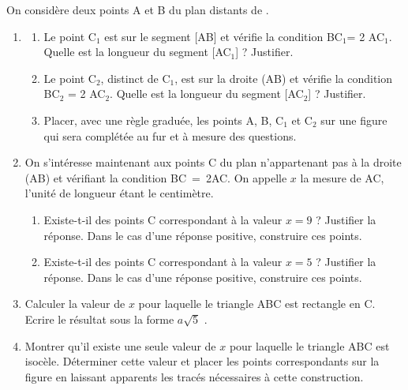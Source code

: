 \bigskip


\begin{exercice}[CRPE 2009 G1] %
   On considère deux points A et B du plan distants de .
   \begin{enumerate}
      \item 
         \begin{enumerate}
            \item Le point C$_1$ est sur le segment [AB] et vérifie la condition BC$_1$= 2 AC$_1$. Quelle est la longueur du segment [AC$_1$] ? Justifier.
            \item Le point C$_2$, distinct de C$_1$, est sur la droite (AB) et vérifie la condition BC$_2$ = 2 AC$_2$. Quelle est la longueur du segment [AC$_2$] ? Justifier.
            \item Placer, avec une règle graduée, les points A, B, C$_1$ et C$_2$ sur une figure qui sera complétée au fur et à mesure des questions. 
         \end{enumerate}       
      \item On s'intéresse maintenant aux points C du plan n'appartenant pas à la droite (AB) et vérifiant la condition BC~=~2AC. On appelle $x$ la mesure de AC, l'unité de longueur étant le centimètre.
         \begin{enumerate}
            \item Existe-t-il des points C correspondant à la valeur $x=9$ ? Justifier la réponse. Dans le cas d'une réponse positive, construire ces points.
            \item Existe-t-il des points C correspondant à la valeur $x=5$ ? Justifier la réponse. Dans le cas d'une réponse positive, construire ces points.
         \end{enumerate}
      \item Calculer la valeur de $x$ pour laquelle le triangle ABC est rectangle en C. Ecrire le résultat sous la forme $a\sqrt5$ .
      \item Montrer qu'il existe une seule valeur de $x$ pour laquelle le triangle ABC est isocèle. Déterminer cette valeur et placer les points correspondants sur la figure en laissant apparents les tracés nécessaires à cette construction.
   \end{enumerate}
\end{exercice}

